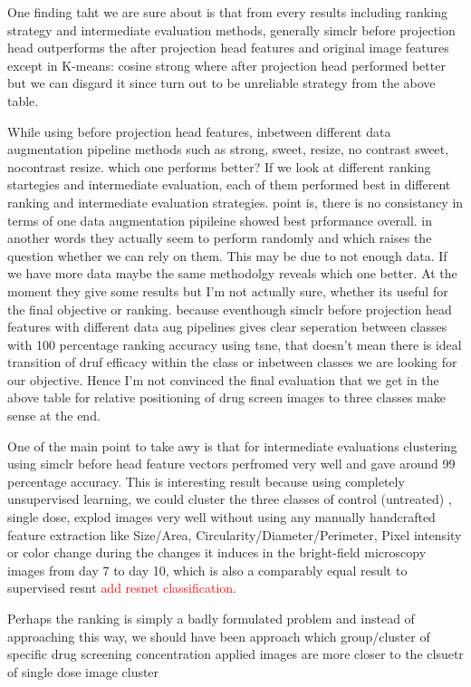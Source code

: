 One finding taht we are sure about is that from every results including ranking strategy and intermediate evaluation methods, generally simclr before projection head outperforms the after projection head features and original image features except in K-means: cosine strong where after projection head performed better but we can disgard it since turn out to be unreliable strategy from the above table.

While using before projection head features, inbetween different data augmentation pipeline methods such as strong, sweet, resize, no contrast sweet, nocontrast resize. which one performs better? If we look at different ranking startegies and intermediate evaluation, each of them performed best in different ranking and intermediate evaluation strategies. point is, there is no consistancy in terms of one data augmentation pipileine showed best prformance overall. in another words they actually seem to perform randomly and which raises the question whether we can rely on them. This may be due to not enough data. If we have more data maybe the same methodolgy reveals which one better. At the moment they give some results but I'm not actually sure, whether its useful for the final objective or ranking. because eventhough simclr before projection head features with different  data aug pipelines gives clear seperation between classes with 100 percentage ranking accuracy using tsne, that doesn't mean there is ideal transition of druf efficacy within the class or inbetween classes we are looking for our objective. Hence I'm not convinced the final evaluation that we get in the above table for relative positioning of drug screen images to three classes make sense at the end. 

One of the main point to take awy is that for intermediate evaluations clustering using simclr before head feature vectors perfromed very well and gave around 99 percentage accuracy. This is interesting result because using completely unsupervised learning, we could cluster the three classes of control (untreated) , single dose, explod images very well without using any manually handcrafted feature extraction like Size/Area, Circularity/Diameter/Perimeter, Pixel intensity or color change during the changes it induces in the bright-field microscopy images from day 7 to day 10, which is also a comparably equal result to supervised resnt \textcolor{red}{add resnet classification}.

Perhaps the ranking is simply a badly formulated problem and instead of approaching this way, we should have been approach which group/cluster of specific drug screening concentration applied images are more closer to the clsuetr of single dose image cluster



